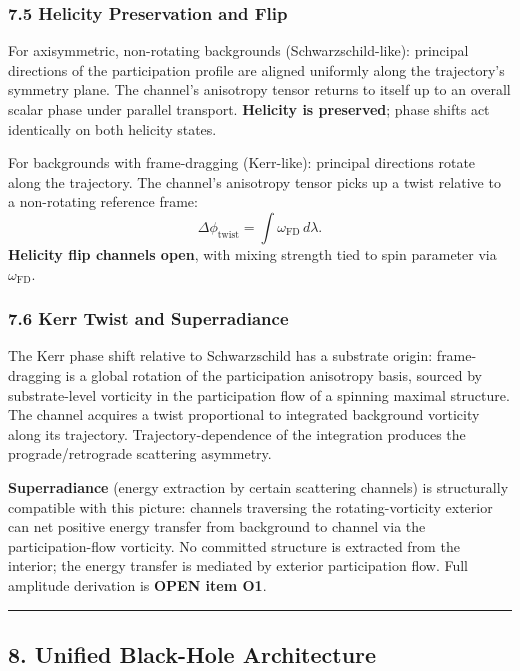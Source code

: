 \documentclass[
  11pt,
  a4paper,
]{article}
\begin{document}
\subsubsection{7.5 Helicity Preservation and
Flip}\label{helicity-preservation-and-flip}

For axisymmetric, non-rotating backgrounds (Schwarzschild-like):
principal directions of the participation profile are aligned uniformly
along the trajectory's symmetry plane. The channel's anisotropy tensor
returns to itself up to an overall scalar phase under parallel
transport. \textbf{Helicity is preserved}; phase shifts act identically
on both helicity states.

For backgrounds with frame-dragging (Kerr-like): principal directions
rotate along the trajectory. The channel's anisotropy tensor picks up a
twist relative to a non-rotating reference frame: \[
\Delta\phi_\mathrm{twist} = \int \omega_\mathrm{FD}\,d\lambda.
\] \textbf{Helicity flip channels open}, with mixing strength tied to
spin parameter via \(\omega_\mathrm{FD}\).

\subsubsection{7.6 Kerr Twist and
Superradiance}\label{kerr-twist-and-superradiance}

The Kerr phase shift relative to Schwarzschild has a substrate origin:
frame-dragging is a global rotation of the participation anisotropy
basis, sourced by substrate-level vorticity in the participation flow of
a spinning maximal structure. The channel acquires a twist proportional
to integrated background vorticity along its trajectory.
Trajectory-dependence of the integration produces the
prograde/retrograde scattering asymmetry.

\textbf{Superradiance} (energy extraction by certain scattering
channels) is structurally compatible with this picture: channels
traversing the rotating-vorticity exterior can net positive energy
transfer from background to channel via the participation-flow
vorticity. No committed structure is extracted from the interior; the
energy transfer is mediated by exterior participation flow. Full
amplitude derivation is \textbf{OPEN item O1}.

\begin{center}\rule{0.5\linewidth}{0.5pt}\end{center}

\subsection{8. Unified Black-Hole
Architecture}\label{unified-black-hole-architecture}
\end{document}
